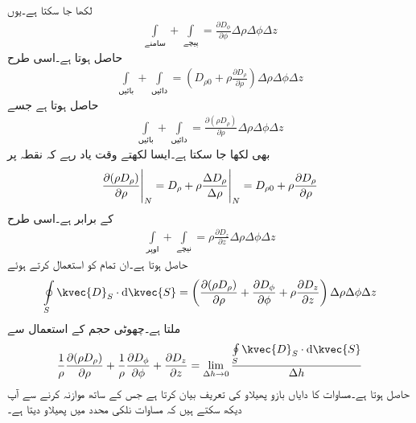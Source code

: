لکھا جا سکتا ہے۔یوں
\begin{align*}
\int \limits_{\textrm{سامنے}}+\int\limits_{\textrm{پیچے}}=\frac{\partial D_{\phi}}{\partial \phi} \Delta \rho \Delta \phi \Delta z
\end{align*}
حاصل ہوتا ہے۔اسی طرح
\begin{align*}
\int \limits_{\textrm{بائیں}}+\int \limits_{\textrm{دائیں}}=\left(D_{\rho 0} +\rho \frac{\partial D_{\rho}}{\partial \rho} \right) \Delta \rho \Delta \phi \Delta z
\end{align*}
حاصل ہوتا ہے جسے
\begin{align*}
\int \limits_{\textrm{بائیں}}+\int \limits_{\textrm{دائیں}}=\frac{\partial (\rho D_{\rho})}{\partial \rho}  \Delta \rho \Delta \phi \Delta z
\end{align*}
بھی لکھا جا سکتا ہے۔ایسا لکھتے وقت یاد رہے کہ نقطہ  پر
\begin{align*}
\eval{\frac{\partial (\rho D_{\rho})}{\partial \rho}}_{N}=\eval{D_{\rho}+\rho \frac{\Delta D_{\rho}}{\Delta \rho}}_{N}=D_{\rho 0} +\rho \frac{\partial D_{\rho}}{\partial \rho}
\end{align*}
کے برابر ہے۔اسی طرح
\begin{align*}
\int \limits_{\textrm{اوپر}}+\int\limits_{\textrm{نیچے}}=\rho \frac{\partial D_{z}}{\partial z} \Delta \rho \Delta \phi \Delta z
\end{align*}
حاصل ہوتا ہے۔ان تمام کو استعمال کرتے ہوئے
\begin{align*}
\oint\limits_{S} \kvec{D}_S \cdot \dif \kvec{S}=\left(\frac{\partial (\rho D_{\rho})}{\partial \rho}+\frac{\partial D_{\phi}}{\partial \phi}  + \rho \frac{\partial D_{z}}{\partial z}   \right)\Delta \rho \Delta \phi \Delta z
\end{align*}
ملتا ہے۔چھوٹی حجم  کے استعمال سے
\begin{align}\label{مساوات_گاؤس_نلکی_پھیلاو_کی_تعریف}
\frac{1}{\rho}\frac{\partial (\rho D_{\rho})}{\partial \rho}+\frac{1}{\rho}\frac{\partial D_{\phi}}{\partial \phi}  +  \frac{\partial D_{z}}{\partial z}=\lim_{\Delta h \to 0} \frac{\oint\limits_{S} \kvec{D}_S \cdot \dif \kvec{S}}{\Delta h}
\end{align}
حاصل ہوتا ہے۔مساوات  کا دایاں بازو پھیلاو کی تعریف بیان کرتا ہے جس کے ساتھ موازنہ کرنے سے آپ دیکھ سکتے ہیں کہ مساوات  نلکی محدد میں پھیلاو  دیتا ہے۔

